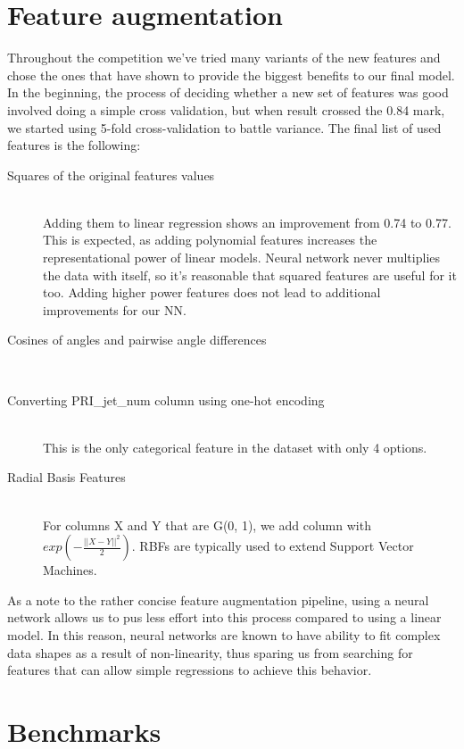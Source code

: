 \documentclass[10pt,conference,compsocconf]{IEEEtran}
\begin{document}
\section{Feature augmentation}
Throughout the competition we've tried many variants of the new features and chose the ones that have shown to provide the biggest benefits to our final model. In the beginning, the process of deciding whether a new set of features was good involved doing a simple cross validation, but when result crossed the 0.84 mark, we started using 5-fold cross-validation to battle variance. The final list of used features is the following:
\begin{description}
\item[Squares of the original features values] \ \\
	Adding them to linear regression shows an improvement from 0.74 to 0.77. This is expected, as adding polynomial features increases the representational power of linear models. Neural network never multiplies the data with itself, so it's reasonable that squared features are useful for it too. Adding higher power features does not lead to additional improvements for our NN.
	
\item[Cosines of angles and pairwise angle differences] \ \\
	
\item[Converting PRI\_jet\_num column using one-hot encoding] \ \\
	This is the only categorical feature in the dataset with only 4 options.
	
\item[Radial Basis Features] \ \\
	For columns X and Y that are G(0, 1), we add column with $exp(-\frac{||X-Y||^2}{2})$.
	RBFs \cite{rbf_book} \cite{rbf_wiki} are typically used to extend Support Vector Machines.
\end{description}

As a note to the rather concise feature augmentation pipeline, using a neural network allows us to pus less effort into this process compared to using a linear model. In this reason, neural networks are known to have ability to fit complex data shapes as a result of non-linearity, thus sparing us from searching for features that can allow simple regressions to achieve this behavior.

\section{Benchmarks}
\end{document}

